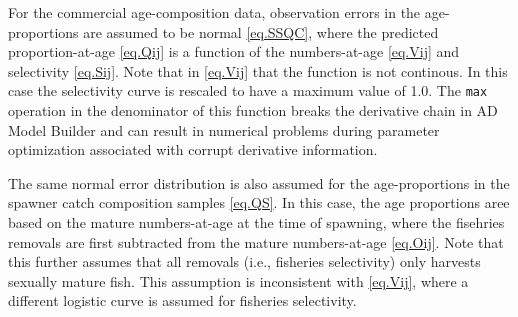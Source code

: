 \documentclass[12pt,letterpaper]{article}
\begin{document}
    For the commercial age-composition data, observation errors in the age-proportions are assumed to be normal \eqref{eq.SSQC}, where the predicted proportion-at-age \eqref{eq.Qij} is a function of the numbers-at-age \eqref{eq.Vij} and selectivity \eqref{eq.Sij}. Note that in \eqref{eq.Vij} that the function is not continous. In this case the selectivity curve is rescaled to have a maximum value of 1.0. The \texttt{max} operation in the denominator of this function breaks the derivative chain in AD Model Builder and can result in numerical problems during parameter optimization associated with corrupt derivative information. 

    The same normal error distribution is also assumed for the age-proportions in the spawner catch composition samples \eqref{eq.QS}.  In this case, the age proportions aree based on the mature numbers-at-age at the time of spawning, where the fisehries removals are first subtracted from the mature numbers-at-age \eqref{eq.Oij}.  Note that this further assumes that all removals (i.e., fisheries selectivity) only harvests sexually mature fish.  This assumption is inconsistent with \eqref{eq.Vij}, where a different logistic curve is assumed for fisheries selectivity.  
\end{document}
